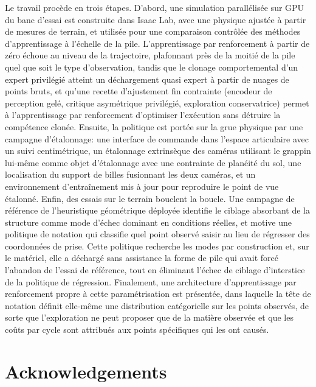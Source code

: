 \documentclass[12pt, letterpaper]{report}
\begin{document}
Le travail proc\`ede en trois \'etapes. D'abord, une simulation
parall\'elis\'ee sur GPU du banc d'essai est construite dans Isaac Lab, avec
une physique ajust\'ee \`a partir de mesures de terrain, et utilis\'ee pour
une comparaison contr\^ol\'ee des m\'ethodes d'apprentissage \`a l'\'echelle
de la pile. L'apprentissage par renforcement \`a partir de z\'ero \'echoue
au niveau de la trajectoire, plafonnant pr\`es de la moiti\'e de la pile
quel que soit le type d'observation, tandis que le clonage comportemental
d'un expert privil\'egi\'e atteint un d\'echargement quasi expert \`a partir
de nuages de points bruts, et qu'une recette d'ajustement fin contrainte
(encodeur de perception gel\'e, critique asym\'etrique privil\'egi\'e,
exploration conservatrice) permet \`a l'apprentissage par renforcement
d'optimiser l'ex\'ecution sans d\'etruire la comp\'etence clon\'ee.
Ensuite, la politique est port\'ee sur la grue physique par une campagne
d'\'etalonnage: une interface de commande dans l'espace articulaire avec un
suivi centim\'etrique, un \'etalonnage extrins\`eque des cam\'eras utilisant
le grappin lui-m\^eme comme objet d'\'etalonnage avec une contrainte de
plan\'eit\'e du sol, une localisation du support de billes fusionnant les
deux cam\'eras, et un environnement d'entra\^inement mis \`a jour pour
reproduire le point de vue \'etalonn\'e. Enfin, des essais sur le terrain
bouclent la boucle. Une campagne de r\'ef\'erence de l'heuristique
g\'eom\'etrique d\'eploy\'ee identifie le ciblage absorbant de la structure
comme mode d'\'echec dominant en conditions r\'eelles, et motive une
politique de notation qui classifie quel point observ\'e saisir au lieu de
r\'egresser des coordonn\'ees de prise. Cette politique recherche les modes
par construction et, sur le mat\'eriel, elle a d\'echarg\'e sans assistance
la forme de pile qui avait forc\'e l'abandon de l'essai de r\'ef\'erence,
tout en \'eliminant l'\'echec de ciblage d'interstice de la politique de
r\'egression. Finalement, une architecture d'apprentissage par renforcement
propre \`a cette param\'etrisation est pr\'esent\'ee, dans laquelle la
t\^ete de notation d\'efinit elle-m\^eme une distribution cat\'egorielle sur
les points observ\'es, de sorte que l'exploration ne peut proposer que de la
mati\`ere observ\'ee et que les co\^uts par cycle sont attribu\'es aux
points sp\'ecifiques qui les ont caus\'es.

\chapter*{Acknowledgements}
\label{chap:acknowledgments}
\end{document}
